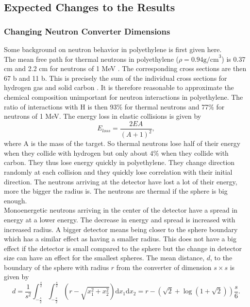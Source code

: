 \documentclass[a4paper,10pt]{article}
\begin{document}
\subsection{Expected Changes to the Results}
\subsubsection{Changing Neutron Converter Dimensions\label{petProp}}
Some background on neutron behavior in polyethylene is first given here.\\The mean free path for thermal neutrons in polyethylene ($\rho=0.94\mathrm{g/cm}^3$) is 0.37 cm and 2.2 cm for neutrons of 1 MeV \cite[p. 369, Table 12.3]{rinard}. The corresponding cross sections are then 67 b and 11 b. This is precisely the sum of the individual cross sections for hydrogen gas and solid carbon \cite[p. 369, Table 12.3]{rinard}. It is therefore reasonable to approximate the chemical composition unimportant for neutron interactions in polyethylene. The ratio of interactions with H is then 93\% for thermal neutrons and 77\% for neutrons of 1 MeV. The energy loss in elastic collisions is given by
\begin{equation}
E_{loss}=\frac{2EA}{(A+1)^2},
\end{equation}
where A is the mass of the target. So thermal neutrons lose half of their energy when they collide with hydrogen but only about $4\%$ when they collide with carbon. They thus lose energy quickly in polyethylene. They change direction randomly at each collision and they quickly lose correlation with their initial direction. The neutrons arriving at the detector have lost a lot of their energy, more the bigger the radius is. The neutrons are thermal if the sphere is big enough.\\Monoenergetic neutrons arriving in the center of the detector have a spread in energy at a lower energy. The decrease in energy and spread is increased with increased radius. A bigger detector means being closer to the sphere boundary which has a similar effect as having a smaller radius. This does not have a big effect if the detector is small compared to the sphere but the change in detector size can have an effect for the smallest spheres. The mean distance, $d$, to the boundary of the sphere with radius $r$ from the converter of dimension $s\times s$ is given by
 \begin{equation}
d=\frac{1}{s^2}\int_{-\frac{s}{2}}^\frac{s}{2}\int_{-\frac{s}{2}}^\frac{s}{2}\left(r-\sqrt{x_1^2+x_2^2}\right)\mathrm{d}x_1\mathrm{d}x_2
=r-\left(\sqrt{2}+\log(1+\sqrt{2})\right)\frac{s}{6}.
\end{equation}
\end{document}
